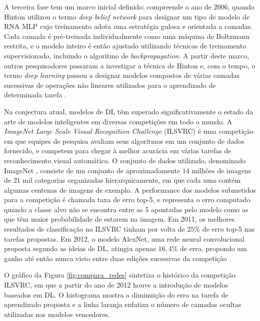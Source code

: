 A terceira fase tem um marco inicial definido: compreende o ano de $2006$, quando Hinton utilizou o termo \emph{deep belief network} para designar um tipo de modelo de RNA MLP cujo treinamento adota uma estratégia gulosa e orientada a camadas. Cada camada é pré-treinada individualmente como uma máquina de Boltzmann restrita, e o modelo inteiro é então ajustado utilizando técnicas de treinamento supervisionado, incluindo o algoritmo de \emph{backpropagation}. A partir deste marco, outros pesquisadores passaram a investigar a técnica de Hinton e, com o tempo, o termo \emph{deep learning} passou a designar modelos compostos de várias camadas sucessivas de operações não lineares utilizados para o aprendizado de determinada tarefa \cite{hinton2006fast, hinton2007learning, goodfellow2016deep, deng2014deep}.

Na conjectura atual, modelos de DL têm superado significativamente o estado da arte de modelos inteligentes em diversas competições em todo o mundo. A \emph{ImageNet Large Scale Visual Recognition Challenge} (ILSVRC) \cite{ImagenetChall} é uma competição em que equipes de pesquisa avaliam seus algoritmos em um conjunto de dados fornecido, e competem para chegar à melhor acurácia em várias tarefas de reconhecimento visual automático. O conjunto de dados utilizado, denominado ImageNet \cite{Imagenet:main}, consiste de um conjunto de aproximadamente $14$ milhões de imagens de $21$ mil categorias organizadas hierarquicamente, em que cada uma contém algumas centenas de imagens de exemplo. A performance dos modelos submetidos para a competição é chamada taxa de erro top-5, e representa o erro computado quando a classe alvo não se encontra entre as 5 apontadas pelo modelo como as que têm maior probabilidade de estarem na imagem. Em 2011, os melhores resultados de  classificação no ILSVRC tinham por volta de $25\%$ de erro top-5 nas tarefas propostas. Em 2012, o modelo AlexNet, uma rede neural convolucional proposta segundo as ideias de DL, atingiu apenas $16,4\%$ de erro, propondo um ganho até então nunca visto entre duas edições sucessivas da competição \cite{ImagenetChall:2012}.

O gráfico da Figura \ref{fig:compara_redes} sintetiza o histórico da competição ILSVRC, em que a partir do ano de 2012 houve a introdução de modelos baseados em DL. O histograma mostra a diminuição do erro na tarefa de aprendizado proposta e a linha laranja enfatiza o número de camadas ocultas utilizadas nos modelos vencedores.

